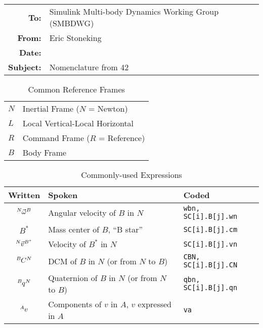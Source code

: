 \documentclass[12pt]{article}
\begin{document}
\begin{tabular}{@{} rl @{}}
    {\bf To:} & Simulink Multi-body Dynamics Working Group (SMBDWG) \\ 
    {\bf From:} & Eric Stoneking \\ 
    {\bf Date:} &  \\ 
    {\bf Subject:} & Nomenclature from 42 \\ 
\hline
\end{tabular}

\vspace{1in}

\begin{table}[h]
\caption{Common Reference Frames}
\begin{center}
\begin{tabular}{|l|l|}
\hline
$N$ & Inertial Frame ($N$ = Newton) \\
$L$ & Local Vertical-Local Horizontal \\
$R$ & Command Frame ($R$ = Reference) \\
$B$ & Body Frame \\ \hline
\end{tabular}
\end{center}
\end{table}
  
\begin{table}[h]
\caption{Commonly-used Expressions}
\begin{center}
\begin{tabular}{|c|l|l|}
\hline
Written & Spoken & Coded \\ \hline
$\tensor[^N]{\vec{\omega}}{^B}$ & Angular velocity of $B$ in $N$ & {\tt wbn, SC[i].B[j].wn} \\ \hline 
${B^*}$ & Mass center of $B$, ``B star'' & {\tt SC[i].B[j].cm} \\ \hline
$\tensor[^N]{\vec{v}}{^{B^*}}$ & Velocity of $B^*$ in $N$ & {\tt SC[i].B[j].vn} \\ \hline
$\tensor[^B]{C}{^N}$ & DCM of $B$ in $N$ (or from $N$ to $B$) & {\tt CBN, SC[i].B[j].CN} \\ \hline
$\tensor[^B]{q}{^N}$ & Quaternion of $B$ in $N$ (or from $N$ to $B$) & {\tt qbn, SC[i].B[j].qn} \\ \hline
$\tensor[^A]{v}{}$ & Components of $v$ in $A$, $v$ expressed in $A$ & {\tt va} \\ \hline
\end{tabular}
\end{center}
\end{table}
\end{document}
